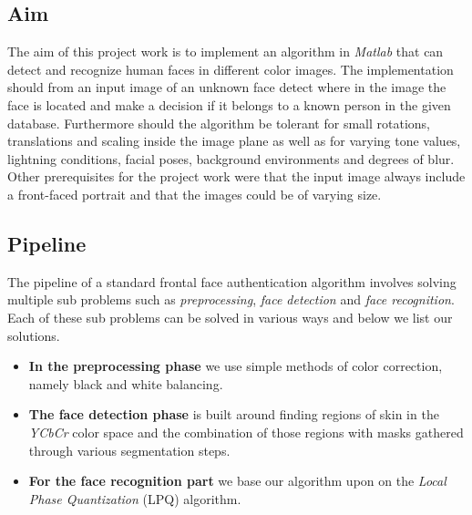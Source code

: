 \subsection{Aim}
The aim of this project work is to implement an algorithm in \textit{Matlab} that can detect and recognize human faces in different color images. The implementation should from an input image of an unknown face detect where in the image the face is located and make a decision if it belongs to a known person in the given database. Furthermore should the algorithm be tolerant for small rotations, translations and scaling inside the image plane as well as for varying tone values, lightning conditions, facial poses, background environments and degrees of blur. Other prerequisites for the project work were that the input image always include a front-faced portrait and that the images could be of varying size.

\subsection{Pipeline}
The pipeline of a standard frontal face authentication algorithm involves solving multiple sub problems such as \textit{preprocessing}, \textit{face detection} and \textit{face recognition}. Each of these sub problems can be solved in various ways and below we list our solutions.

\begin{itemize}
  \item \textbf{In the preprocessing phase} we use simple methods of color correction, namely black and white balancing. 
  \item \textbf{The face detection phase} is built around finding regions of skin in the \textit{YCbCr} color space and the combination of those regions with masks gathered through various segmentation steps. 
  \item \textbf{For the face recognition part} we base our algorithm upon on the \textit{Local Phase Quantization} (LPQ) algorithm. 

\end{itemize}
